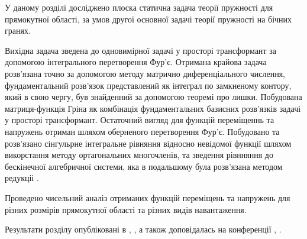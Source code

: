 У даному розділі досліджено плоска статична задача теорії пружності для прямокутної області,
за умов другої основної задачі теорії пружності на бічних гранях.

Вихідна задача зведена до одновимірної задачі у просторі трансформант за допомогою інтегрального перетворення Фур'є.
Отримана крайова задача розв'язана точно за допомогою методу матрично диференціального числення,
фундаментальний розв'язок представлений як інтеграл по замкненому контору, який в свою чергу, був знайденний за допомогою теоремі про лишки.
Побудована матриця-функція Гріна як комбінація фундаментальних базисних розв'язків задачі у просторі трансформант.
Остаточний вигляд для функцій переміщеннь та напружень отриман шляхом оберненого перетворення Фур'є.
Побудовано та розв'язано сінгульрне інтегральне рівняння відносно невідомої функції шляхом викорстання методу ортагональних многочленів, та зведення рівнняння до бескінечної алгебричної системи,
яка в подальшому була розв'язана методом редукціі \cite{popov_3}.

Проведено чисельний аналіз отриманих функцій переміщень та напружень для різних розмірів прямокутної області та різних видів навантаження.

Результати розділу опубліковані в \cite{pozhylenkov_4}, \cite{pozhylenkov_6}, а також доповідалась на конференції \cite{conf_3}, \cite{conf_5}.